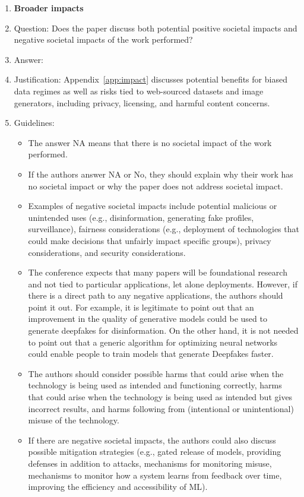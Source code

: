 \documentclass{article}
\begin{document}
\begin{enumerate}
\item {\bf Broader impacts}
    \item[] Question: Does the paper discuss both potential positive societal impacts and negative societal impacts of the work performed?
    \item[] Answer: \answerYes{}
    \item[] Justification: Appendix~\ref{app:impact} discusses potential benefits for biased data regimes as well as risks tied to web-sourced datasets and image generators, including privacy, licensing, and harmful content concerns.
    \item[] Guidelines:
    \begin{itemize}
        \item The answer NA means that there is no societal impact of the work performed.
        \item If the authors answer NA or No, they should explain why their work has no societal impact or why the paper does not address societal impact.
        \item Examples of negative societal impacts include potential malicious or unintended uses (e.g., disinformation, generating fake profiles, surveillance), fairness considerations (e.g., deployment of technologies that could make decisions that unfairly impact specific groups), privacy considerations, and security considerations.
        \item The conference expects that many papers will be foundational research and not tied to particular applications, let alone deployments. However, if there is a direct path to any negative applications, the authors should point it out. For example, it is legitimate to point out that an improvement in the quality of generative models could be used to generate deepfakes for disinformation. On the other hand, it is not needed to point out that a generic algorithm for optimizing neural networks could enable people to train models that generate Deepfakes faster.
        \item The authors should consider possible harms that could arise when the technology is being used as intended and functioning correctly, harms that could arise when the technology is being used as intended but gives incorrect results, and harms following from (intentional or unintentional) misuse of the technology.
        \item If there are negative societal impacts, the authors could also discuss possible mitigation strategies (e.g., gated release of models, providing defenses in addition to attacks, mechanisms for monitoring misuse, mechanisms to monitor how a system learns from feedback over time, improving the efficiency and accessibility of ML).
    \end{itemize}
    

\end{enumerate}
\end{document}
